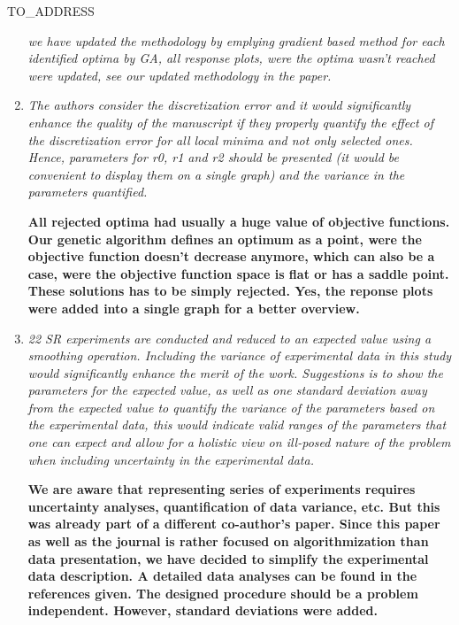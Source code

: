 \documentclass[a4paper,10pt]{letter}
\begin{document}
\begin{letter}{TO_ADDRESS}
\begin{enumerate}
{\it we have updated the methodology by emplying gradient based method for each identified optima by GA, all response plots, were the optima wasn't reached were updated, see our updated methodology in the paper.}

\item {\it The authors consider the discretization error and it would significantly enhance the quality of the manuscript if they properly quantify the effect of the discretization error for all local minima and not only selected ones. Hence, parameters for r0, r1 and r2 should be presented (it would be convenient to display them on a single graph) and the variance in the parameters quantified.}

{\bf All rejected optima had usually a huge value of objective functions. Our genetic algorithm defines an optimum as a point, were the objective function doesn't decrease anymore, which can also be a case, were the objective function space is flat or has a saddle point. These solutions has to be simply rejected. Yes, the reponse plots were added into a single graph for a better overview. } 

\item { \it 22 SR experiments are conducted and reduced to an expected value using a smoothing operation. Including the variance of experimental data in this study would significantly enhance the merit of the work. Suggestions is to show the parameters for the expected value, as well as one standard deviation away from the expected value to quantify the variance of the parameters based on the experimental data, this would indicate valid ranges of the parameters that one can expect and allow for a holistic view on ill-posed nature of the problem when including uncertainty in the experimental data.}

{\bf We are aware that representing  series of experiments requires uncertainty analyses, quantification of data variance, etc. But this was already part of a different co-author's paper. Since this paper as well as the journal is rather focused on algorithmization than data presentation, we have decided to simplify the experimental data description. A detailed data analyses can be found in the references given. The designed procedure should be a problem independent. However, standard deviations were added. }

\end{enumerate}

\end{letter}
\end{document}
